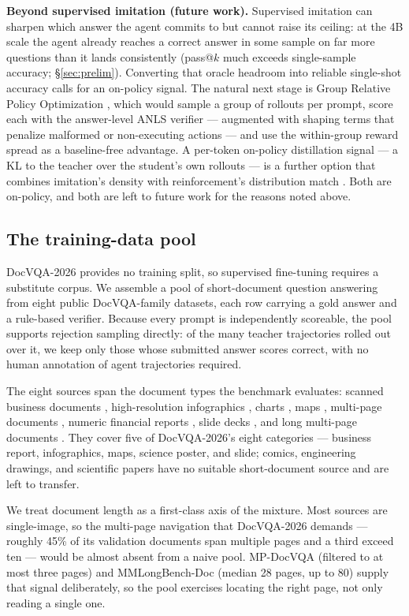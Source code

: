 \textbf{Beyond supervised imitation (future work).} Supervised imitation can sharpen which answer the agent commits to but cannot raise its ceiling: at the 4B scale the agent already reaches a correct answer in some sample on far more questions than it lands consistently (pass@$k$ much exceeds single-sample accuracy; \S\ref{sec:prelim}). Converting that oracle headroom into reliable single-shot accuracy calls for an on-policy signal. The natural next stage is Group Relative Policy Optimization \citep{grpo}, which would sample a group of rollouts per prompt, score each with the answer-level ANLS verifier --- augmented with shaping terms that penalize malformed or non-executing actions --- and use the within-group reward spread as a baseline-free advantage. A per-token on-policy distillation signal --- a KL to the teacher over the student's own rollouts --- is a further option that combines imitation's density with reinforcement's distribution match \citep{opd}. Both are on-policy, and both are left to future work for the reasons noted above.

\subsection{The training-data pool}
\label{sec:pool}

DocVQA-2026 provides no training split, so supervised fine-tuning requires a substitute corpus. We assemble a pool of short-document question answering from eight public DocVQA-family datasets, each row carrying a gold answer and a rule-based verifier. Because every prompt is independently scoreable, the pool supports rejection sampling directly: of the many teacher trajectories rolled out over it, we keep only those whose submitted answer scores correct, with no human annotation of agent trajectories required.

The eight sources span the document types the benchmark evaluates: scanned business documents \citep{docvqa}, high-resolution infographics \citep{infographicvqa}, charts \citep{chartqa}, maps \citep{mapqa}, multi-page documents \citep{mpdocvqa}, numeric financial reports \citep{tatdqa}, slide decks \citep{slidevqa}, and long multi-page documents \citep{mmlongbench}. They cover five of DocVQA-2026's eight categories --- business report, infographics, maps, science poster, and slide; comics, engineering drawings, and scientific papers have no suitable short-document source and are left to transfer.

We treat document length as a first-class axis of the mixture. Most sources are single-image, so the multi-page navigation that DocVQA-2026 demands --- roughly 45\% of its validation documents span multiple pages and a third exceed ten --- would be almost absent from a naive pool. MP-DocVQA (filtered to at most three pages) and MMLongBench-Doc (median 28 pages, up to 80) supply that signal deliberately, so the pool exercises locating the right page, not only reading a single one.

